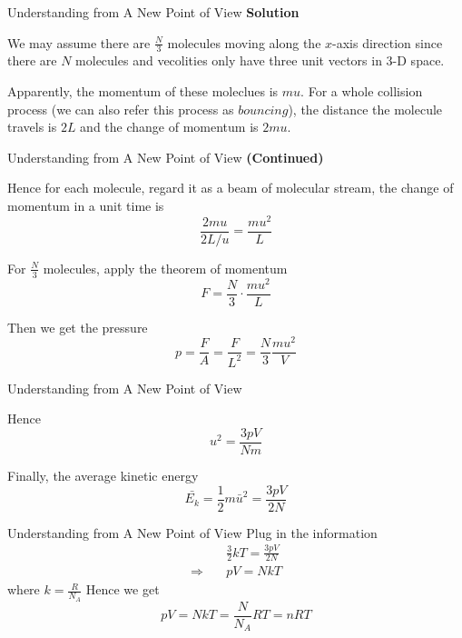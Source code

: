 \documentclass[12pt,compress]{beamer}
\begin{document}
\begin{frame}{Understanding from A New Point of View}
	\textbf{Solution}
	\par We may assume there are $\frac{N}{3}$ molecules moving along the $x$-axis direction
	since there are $N$ molecules and vecolities only have three unit vectors in 3-D space.
	\par Apparently, the momentum of these moleclues is $mu$. For a whole collision process
	(we can also refer this process as $bouncing$), the distance the molecule travels is $2L$
	and the change of momentum is $2mu$.
\end{frame}
\begin{frame}{Understanding from A New Point of View}
	\textbf{(Continued)}
	\par Hence for each molecule, regard it as a beam of molecular stream, the change of momentum in a unit time is
	\begin{equation}
		\frac{2mu}{2L/u} = \frac{mu^2}{L}
		\label{eq:impulse}
	\end{equation}
	\par For $\frac{N}{3}$ molecules, apply the theorem of momentum
	\begin{equation}
		F = \frac{N}{3} \cdot \frac{mu^2}{L}
	\end{equation}
	\par Then we get the pressure
	\begin{equation}
		p = \frac{F}{A} = \frac{F}{L^2} = \frac{N}{3}\frac{mu^2}{V}
	\end{equation}
\end{frame}
\begin{frame}{Understanding from A New Point of View}
	\par Hence
	\begin{equation}
		u^2 = \frac{3pV}{Nm}
		\label{eq:u}
	\end{equation}
	\par Finally, the average kinetic energy
	\begin{equation}
		\bar{E_k} = \frac{1}{2}m\bar{u}^2 = \frac{3pV}{2N}
	\end{equation}
\end{frame}
\begin{frame}{Understanding from A New Point of View}
	Plug in the information
	\begin{align}
		                  & \frac{3}{2}kT = \frac{3pV}{2N} \\
		\Rightarrow \quad & pV = NkT
	\end{align}
	where $k = \frac{R}{N_A}$
	Hence we get
	\begin{equation}
		pV = NkT = \frac{N}{N_A}RT = nRT
	\end{equation}
\end{frame}
\end{document}
